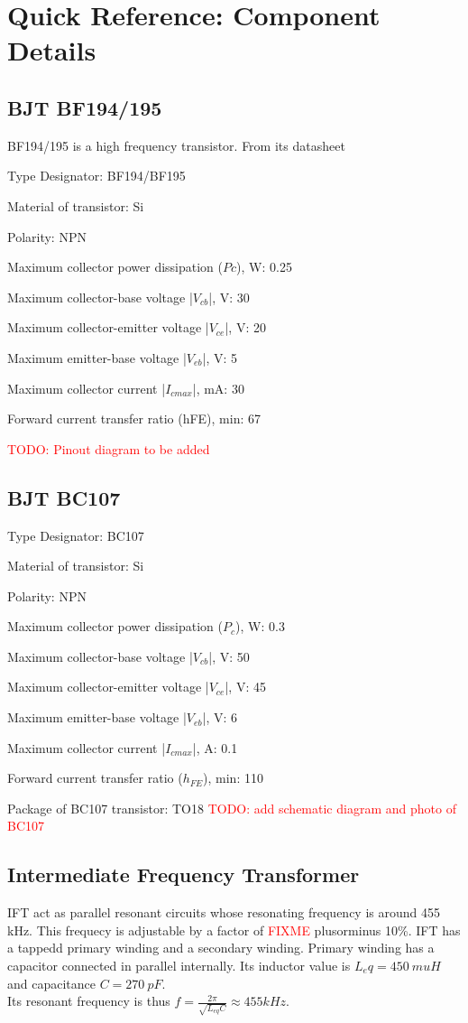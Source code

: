 \chapter {Quick Reference: Component Details}
\section{BJT BF194/195}
\label{BF194/195}
BF194/195 is a high frequency transistor. From its datasheet 

Type Designator: BF194/BF195

Material of transistor: Si

Polarity: NPN

Maximum collector power dissipation ($Pc$), W: 0.25

Maximum collector-base voltage |$V_{cb}$|, V: 30

Maximum collector-emitter voltage |$V_{ce}$|, V: 20

Maximum emitter-base voltage |$V_{eb}$|, V: 5

Maximum collector current |$I_{c max}$|, mA: 30

Forward current transfer ratio (hFE), min: 67

\textcolor{red}{TODO: Pinout diagram to be added}
\section{BJT BC107}
\label{BC107}
Type Designator: BC107

Material of transistor: Si

Polarity: NPN

Maximum collector power dissipation ($P_c$), W: 0.3

Maximum collector-base voltage |$V_{cb}$|, V: 50

Maximum collector-emitter voltage |$V_{ce}$|, V: 45

Maximum emitter-base voltage |$V_{eb}$|, V: 6

Maximum collector current |$I_{cmax}$|, A: 0.1

Forward current transfer ratio ($h_{FE}$), min: 110

Package of BC107 transistor: TO18
\textcolor{red}{TODO: add schematic diagram and photo of BC107}

\section{Intermediate Frequency Transformer}
\label{IFT}
IFT act as parallel resonant circuits whose resonating frequency is around 455 kHz. This frequecy is adjustable by a factor of  \textcolor{red}{FIXME} plusorminus 10\%. IFT has a tappedd primary winding and a secondary winding. Primary winding has a capacitor connected in parallel internally. Its inductor value is $L_eq=450\ mu H$ and capacitance $C=270\ pF$. 
\\Its resonant frequency is thus $f=\frac{2\pi}{\sqrt{L_{eq}C}}\approx 455 kHz$.

